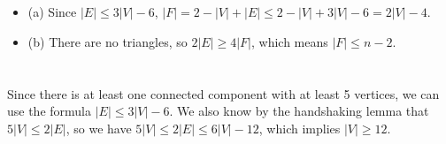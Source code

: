 \documentclass[12pt]{article}
\begin{document}
\section{}
\noindent{}\bigskip\par
\begin{itemize}
    \item (a) Since $|E| \leq 3 |V|-6$, $|F|=2-|V|+|E|\leq 2 - |V| + 3|V|-6=2|V|-4$.
    \item (b) There are no triangles, so $2|E| \geq 4|F|$, which means $|F| \leq n-2$.
\end{itemize}

\section{}
\noindent{}\bigskip\par
Since there is at least one connected component with at least 5 vertices, we can use the formula $|E| \leq 3 |V| - 6$. We also know by the handshaking lemma that $5|V|\leq 2|E|$, so we have $5|V| \leq 2 |E| \leq 6|V|-12$, which implies $|V| \geq 12$.
\end{document}
